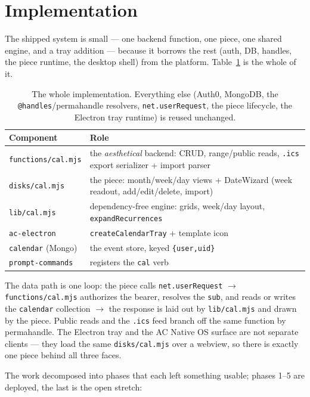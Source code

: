 \documentclass[10pt,letterpaper,twocolumn]{article}
\begin{document}
\section{Implementation}

The shipped system is small --- one backend function, one piece, one shared engine, and a tray addition --- because it borrows the rest (auth, DB, handles, the piece runtime, the desktop shell) from the platform. Table~\ref{tab:files} is the whole of it.

\begin{table}[h]
\small
\centering
\begin{tabularx}{\columnwidth}{l X}
\toprule
\textbf{Component} & \textbf{Role} \\
\midrule
\texttt{functions/cal.mjs} & the \emph{aesthetical} backend: CRUD, range/public reads, \texttt{.ics} export serializer + import parser \\
\texttt{disks/cal.mjs} & the piece: month/week/day views + DateWizard (week readout, add/edit/delete, import) \\
\texttt{lib/cal.mjs} & dependency-free engine: grids, week/day layout, \texttt{expandRecurrences} \\
\texttt{ac-electron} & \texttt{createCalendarTray} + template icon \\
\texttt{calendar} (Mongo) & the event store, keyed \texttt{\{user,uid\}} \\
\texttt{prompt-commands} & registers the \texttt{cal} verb \\
\bottomrule
\end{tabularx}
\caption{The whole implementation. Everything else (Auth0, MongoDB, the \texttt{@handles}/permahandle resolvers, \texttt{net.userRequest}, the piece lifecycle, the Electron tray runtime) is reused unchanged.}
\label{tab:files}
\end{table}

The data path is one loop: the piece calls \texttt{net.userRequest} $\to$ \texttt{functions/cal.mjs} authorizes the bearer, resolves the \texttt{sub}, and reads or writes the \texttt{calendar} collection $\to$ the response is laid out by \texttt{lib/cal.mjs} and drawn by the piece. Public reads and the \texttt{.ics} feed branch off the same function by permahandle. The Electron tray and the AC Native OS surface are not separate clients --- they load the same \texttt{disks/cal.mjs} over a webview, so there is exactly one piece behind all three faces.

The work decomposed into phases that each left something usable; phases 1--5 are deployed, the last is the open stretch:
\end{document}
